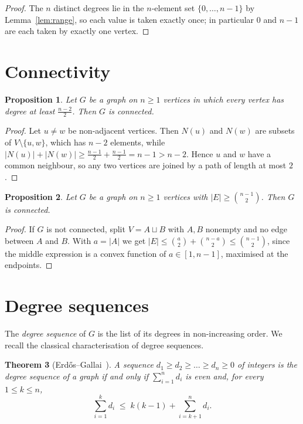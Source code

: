 \documentclass[11pt]{amsart}
\newtheorem{theorem}{Theorem}[section]
\newtheorem{proposition}[theorem]{Proposition}
\theoremstyle{definition}
\theoremstyle{remark}
\begin{document}
\begin{proof}
The $n$ distinct degrees lie in the $n$-element set $\{0,\dots,n-1\}$ by
Lemma~\ref{lem:range}, so each value is taken exactly once; in particular $0$
and $n-1$ are each taken by exactly one vertex.
\end{proof}

\section{Connectivity}

\begin{proposition}\label{prop:mindeg}
Let $G$ be a graph on $n\ge 1$ vertices in which every vertex has degree at
least $\frac{n-2}{2}$. Then $G$ is connected.
\end{proposition}

\begin{proof}
Let $u\ne w$ be non-adjacent vertices. Then $N(u)$ and $N(w)$ are subsets of
$V\setminus\{u,w\}$, which has $n-2$ elements, while
$|N(u)|+|N(w)|\ge \frac{n-1}{2}+\frac{n-1}{2}=n-1>n-2$. Hence $u$ and $w$ have a
common neighbour, so any two vertices are joined by a path of length at most
$2$.
\end{proof}

\begin{proposition}\label{prop:edges}
Let $G$ be a graph on $n\ge 1$ vertices with $|E|\ge\binom{n-1}{2}$. Then $G$
is connected.
\end{proposition}

\begin{proof}
If $G$ is not connected, split $V=A\sqcup B$ with $A,B$ nonempty and no edge
between $A$ and $B$. With $a=|A|$ we get
$|E|\le\binom{a}{2}+\binom{n-a}{2}\le\binom{n-1}{2}$, since the middle
expression is a convex function of $a\in[1,n-1]$, maximised at the endpoints.
\end{proof}

\section{Degree sequences}

The \emph{degree sequence} of $G$ is the list of its degrees in non-increasing
order. We recall the classical characterisation of degree sequences.

\begin{theorem}[Erd\H{o}s--Gallai~\cite{EG}]\label{thm:EG}
A sequence $d_1\ge d_2\ge\dots\ge d_n\ge 0$ of integers is the degree sequence
of a graph if and only if $\sum_{i=1}^n d_i$ is even and, for every
$1\le k\le n$,
\[
  \sum_{i=1}^{k}d_i\;\le\;k(k-1)+\sum_{i=k+1}^{n}d_i .
\]
\end{theorem}
\end{document}
